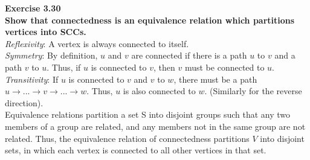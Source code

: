 \documentclass{article}
\newenvironment{problem}[2][Exercise]
    { \begin{mdframed}[backgroundcolor=gray!20] \textbf{#1 #2} \\}
    {  \end{mdframed}}
\begin{document}
\begin{problem}{3.30}
    \textbf{Show that connectedness is an equivalence relation which partitions vertices into SCCs.}
    \\
    \textit{Reflexivity}: A vertex is always connected to itself.
    \\
    \textit{Symmetry}: By definition, $u$ and $v$ are connected if there is a path $u$ to $v$ and a path $v$ to $u$. Thus, if $u$ is connected to $v$, then $v$ must be connected to $u$.
    \\
    \textit{Transitivity}: If $u$ is connected to $v$ and $v$ to $w$, there must be a path $u \rightarrow ... \rightarrow v \rightarrow ... \rightarrow w$. Thus, $u$ is also connected to $w$. (Similarly for the reverse direction).
    \\
    Equivalence relations partition a set S into disjoint groups such that any two members of a group are related, and any members not in the same group are not related. Thus, the equivalence relation of connectedness partitions $V$ into disjoint sets, in which each vertex is connected to all other vertices in that set.
\end{problem}
\end{document}
